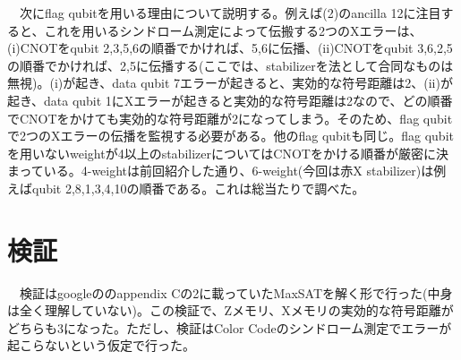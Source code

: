 \documentclass[a4paper,10pt]{ltjsarticle}
\begin{document}
{    　次にflag qubitを用いる理由について説明する。例えば(2)のancilla 12に注目すると、これを用いるシンドローム測定によって伝搬する2つのXエラーは、(i)CNOTをqubit 2,3,5,6の順番でかければ、5,6に伝播、(ii)CNOTをqubit 3,6,2,5の順番でかければ、2,5に伝播する(ここでは、stabilizerを法として合同なものは無視)。(i)が起き、data qubit 7エラーが起きると、実効的な符号距離は2、(ii)が起き、data qubit 1にXエラーが起きると実効的な符号距離は2なので、どの順番でCNOTをかけても実効的な符号距離が2になってしまう。そのため、flag qubitで2つのXエラーの伝播を監視する必要がある。他のflag qubitも同じ。flag qubit を用いないweightが4以上のstabilizerについてはCNOTをかける順番が厳密に決まっている。4-weightは前回紹介した通り、6-weight(今回は赤X stabilizer)は例えばqubit 2,8,1,3,4,10の順番である。これは総当たりで調べた。
}

\section{検証}{
    　検証はgoogleの\cite{lacroix2024}のappendix Cの2に載っていたMaxSATを解く形で行った(中身は全く理解していない)。この検証で、Zメモリ、Xメモリの実効的な符号距離がどちらも3になった。ただし、検証はColor Codeのシンドローム測定でエラーが起こらないという仮定で行った。
}

\printbibliography
\end{document}

